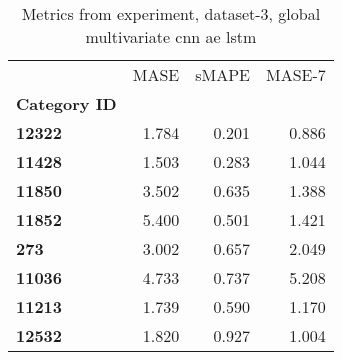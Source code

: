 \begin{table}[h]
\centering
\caption{Metrics from experiment, dataset-3, global multivariate cnn ae lstm}
\label{table:global-multivariate-cnn-ae-lstm-dataset-3}
\begin{tabular}{lrrr}
\toprule
{} &   MASE &  sMAPE &  MASE-7 \\
\textbf{Category ID} &        &        &         \\
\midrule
\textbf{12322      } &  1.784 &  0.201 &   0.886 \\
\textbf{11428      } &  1.503 &  0.283 &   1.044 \\
\textbf{11850      } &  3.502 &  0.635 &   1.388 \\
\textbf{11852      } &  5.400 &  0.501 &   1.421 \\
\textbf{273        } &  3.002 &  0.657 &   2.049 \\
\textbf{11036      } &  4.733 &  0.737 &   5.208 \\
\textbf{11213      } &  1.739 &  0.590 &   1.170 \\
\textbf{12532      } &  1.820 &  0.927 &   1.004 \\
\bottomrule
\end{tabular}
\end{table}
